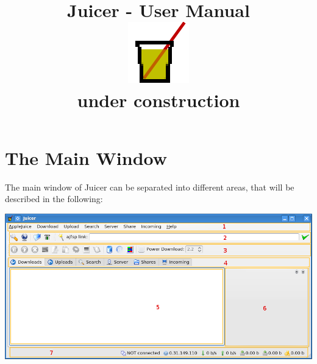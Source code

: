 \documentclass[a4paper,10pt]{book}
\title{Juicer - User Manual\\\includegraphics{../juicer-big.png}\\\small{under construction}}
\begin{document}
\maketitle

\chapter{The Main Window}

The main window of Juicer can be separated into different areas, that will be described in the following:

\includegraphics[width=1.0\textwidth]{./images/mainwindow.png}
\end{document}
